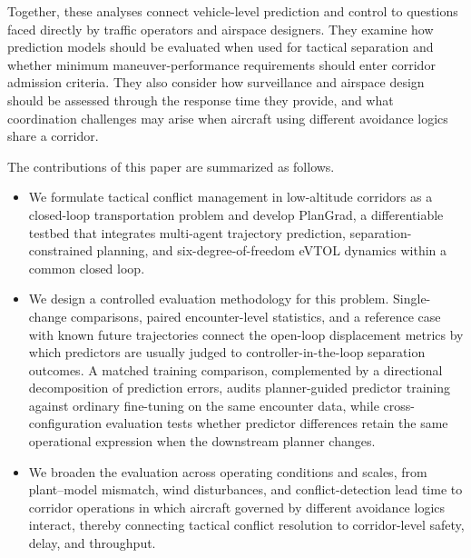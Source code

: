 \documentclass[11pt]{article}
\theoremstyle{plain}
\theoremstyle{definition}
\newcommand{\method}{PlanGrad}
\begin{document}
Together, these analyses connect vehicle-level prediction and control to questions faced directly by traffic operators and airspace designers. They examine how prediction models should be evaluated when used for tactical separation and whether minimum maneuver-performance requirements should enter corridor admission criteria. They also consider how surveillance and airspace design should be assessed through the response time they provide, and what coordination challenges may arise when aircraft using different avoidance logics share a corridor.

The contributions of this paper are summarized as follows.

\begin{itemize}
\item[(i)] We formulate tactical conflict management in low-altitude
		corridors as a closed-loop transportation problem and develop
		\method, a differentiable testbed that integrates multi-agent
		trajectory prediction, separation-constrained planning, and
		six-degree-of-freedom eVTOL dynamics within a common closed loop.

	\item[(ii)] We design a controlled evaluation methodology for this
problem. Single-change comparisons, paired encounter-level statistics,
and a reference case with known future trajectories connect the
open-loop displacement metrics by which predictors are usually judged
to controller-in-the-loop separation outcomes. A matched training
comparison, complemented by a directional decomposition of prediction
errors, audits planner-guided predictor training against ordinary
fine-tuning on the same encounter data, while cross-configuration
evaluation tests whether predictor differences retain the same
operational expression when the downstream planner changes.

	\item[(iii)] We broaden the evaluation across operating conditions
		and scales, from plant--model mismatch, wind disturbances, and
		conflict-detection lead time to corridor operations in which
		aircraft governed by different avoidance logics interact, thereby
		connecting tactical conflict resolution to corridor-level safety,
		delay, and throughput.

\end{itemize}


\end{document}

